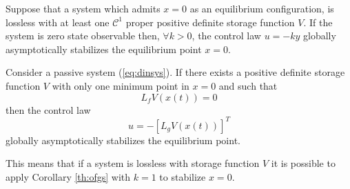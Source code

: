 %
\begin{cor}\label{th:ofgs}
	Suppose that a system which admits $x=0$ as an equilibrium configuration, is lossless with at least one $\mathcal{C}^1$ proper positive definite storage function $V$. If the system is zero state observable then, $\forall k>0$, the control law $u=-ky$ globally asymptotically stabilizes the equilibrium point $x=0$.
\end{cor}
%
\begin{note}
	Consider a passive system (\ref{eq:dinsys}). If there exists a positive definite storage function $V$ with only one minimum point in $x=0$ and such that 
	\begin{equation*}
		L_fV(x(t))=0
	\end{equation*}
	then the control law
	\begin{equation*}
		u = -\left[L_gV(x(t))\right]^T
	\end{equation*}
	globally asymptotically stabilizes the equilibrium point. 
\end{note}
%
This means that if a system is lossless with storage function $V$ it is possible to apply Corollary \ref{th:ofgs} with $k=1$ to stabilize $x=0$.
%